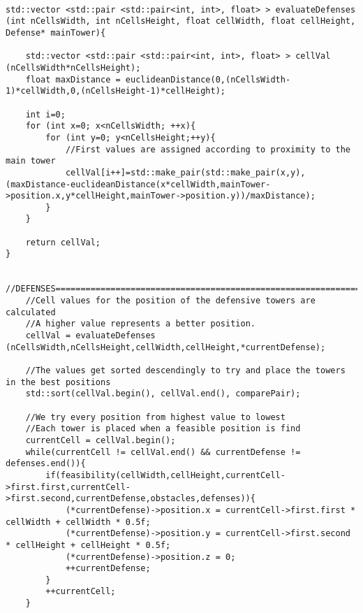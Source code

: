 \begin{lstlisting}

std::vector <std::pair <std::pair<int, int>, float> > evaluateDefenses (int nCellsWidth, int nCellsHeight, float cellWidth, float cellHeight, Defense* mainTower){

	std::vector <std::pair <std::pair<int, int>, float> > cellVal (nCellsWidth*nCellsHeight);
	float maxDistance = euclideanDistance(0,(nCellsWidth-1)*cellWidth,0,(nCellsHeight-1)*cellHeight);

	int i=0;
	for (int x=0; x<nCellsWidth; ++x){
		for (int y=0; y<nCellsHeight;++y){
			//First values are assigned according to proximity to the main tower
			cellVal[i++]=std::make_pair(std::make_pair(x,y),(maxDistance-euclideanDistance(x*cellWidth,mainTower->position.x,y*cellHeight,mainTower->position.y))/maxDistance);
		}
	}

	return cellVal;
}


//DEFENSES================================================================================
	//Cell values for the position of the defensive towers are calculated
	//A higher value represents a better position.
	cellVal = evaluateDefenses (nCellsWidth,nCellsHeight,cellWidth,cellHeight,*currentDefense);

	//The values get sorted descendingly to try and place the towers in the best positions
	std::sort(cellVal.begin(), cellVal.end(), comparePair);

	//We try every position from highest value to lowest
	//Each tower is placed when a feasible position is find
	currentCell = cellVal.begin();
	while(currentCell != cellVal.end() && currentDefense != defenses.end()){
		if(feasibility(cellWidth,cellHeight,currentCell->first.first,currentCell->first.second,currentDefense,obstacles,defenses)){
			(*currentDefense)->position.x = currentCell->first.first * cellWidth + cellWidth * 0.5f;
        	(*currentDefense)->position.y = currentCell->first.second * cellHeight + cellHeight * 0.5f;
        	(*currentDefense)->position.z = 0;
        	++currentDefense;
		}
		++currentCell;
	}
\end{lstlisting}
